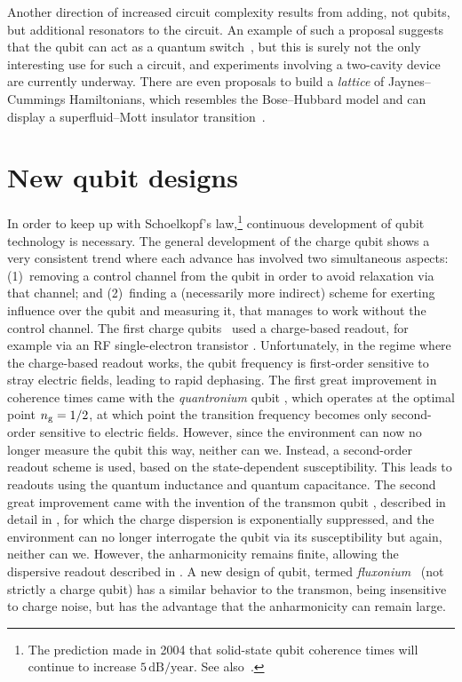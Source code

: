 Another direction of increased circuit complexity results from adding, not qubits, but additional resonators to the circuit. An example of such a proposal suggests that the qubit can act as a quantum switch~\cite{mariantoni_two-resonator_2008}, but this is surely not the only interesting use for such a circuit, and experiments involving a two-cavity device are currently underway. There are even proposals to build a \emph{lattice} of Jaynes--Cummings Hamiltonians, which resembles the Bose--Hubbard model \cite{greentree_quantum_2006} and can display a superfluid--Mott insulator transition~\cite{koch_superfluid--mott_2009}.

\section{New qubit designs}
In order to keep up with Schoelkopf's law,\footnote{The prediction made in 2004 that solid-state qubit coherence times will continue to increase $5\,\text{dB/year}$. See also~\cite{xkcd_extrapolating}.} continuous development of qubit technology is necessary. The general development of the charge qubit shows a very consistent trend where each advance has involved two simultaneous aspects: (1)~removing a control channel from the qubit in order to avoid relaxation via that channel; and (2)~finding a (necessarily more indirect) scheme for exerting influence over the qubit and measuring it, that manages to work without the control channel. The first charge qubits~\cite{nakamura_coherent_1999} used a charge-based readout, for example via an RF single-electron transistor \cite{aassime_radio-frequency_2001, lehnert_measurement_2003}. Unfortunately, in the regime where the charge-based readout works, the qubit frequency is first-order sensitive to stray electric fields, leading to rapid dephasing. The first great improvement in coherence times came with the \emph{quantronium} qubit \cite{vion_manipulatingquantum_2002}, which operates at the optimal point $n_{\text{g}}=1/2$, at which point the transition frequency becomes only second-order sensitive to electric fields. However, since the environment can now no longer measure the qubit this way, neither can we. Instead, a second-order readout scheme is used, based on the state-dependent susceptibility. This leads to readouts using the quantum inductance and quantum capacitance. The second great improvement came with the invention of the transmon qubit \cite{koch_charge-insensitive_2007, schreier_suppressing_2008}, described in detail in , for which the charge dispersion is exponentially suppressed, and the environment can no longer interrogate the qubit via its susceptibility but again, neither can we. However, the anharmonicity remains finite, allowing the dispersive readout described in . A new design of qubit, termed \emph{fluxonium}~\cite{manucharyan_defyingfine_2009} (not strictly a charge qubit) has a similar behavior to the transmon, being insensitive to charge noise, but has the advantage that the anharmonicity can remain large.

